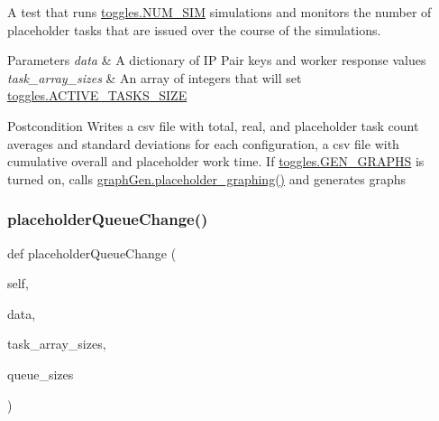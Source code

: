A test that runs \mbox{\hyperlink{namespacedynamicfilterapp_1_1toggles_a3baf5565851cd87736238d8dddfc1106}{toggles.\+N\+U\+M\+\_\+\+S\+IM}} simulations and monitors the number of placeholder tasks that are issued over the course of the simulations. 


\begin{DoxyParams}{Parameters}
{\em data} & A dictionary of IP Pair keys and worker response values \\
\hline
{\em task\+\_\+array\+\_\+sizes} & An array of integers that will set \mbox{\hyperlink{namespacedynamicfilterapp_1_1toggles_a374727dba0574510b39c1e2871f69e48}{toggles.\+A\+C\+T\+I\+V\+E\+\_\+\+T\+A\+S\+K\+S\+\_\+\+S\+I\+ZE}} \\
\hline
\end{DoxyParams}
\begin{DoxyPostcond}{Postcondition}
Writes a csv file with total, real, and placeholder task count averages and standard deviations for each configuration, a csv file with cumulative overall and placeholder work time. If \mbox{\hyperlink{namespacedynamicfilterapp_1_1toggles_a57c1e3f291181d680f3ee118fa5c4ab8}{toggles.\+G\+E\+N\+\_\+\+G\+R\+A\+P\+HS}} is turned on, calls \mbox{\hyperlink{namespacedynamicfilterapp_1_1graph_gen_aa390916522804b2486fb15d5af94c93a}{graph\+Gen.\+placeholder\+\_\+graphing()}} and generates graphs 
\end{DoxyPostcond}
\mbox{\label{classdynamicfilterapp_1_1test__simulations_1_1_simulation_test_a49b243b561aef89859a0f2676124dbc3}} 
\subsubsection{\texorpdfstring{placeholder\+Queue\+Change()}{placeholderQueueChange()}}
{\footnotesize\ttfamily def placeholder\+Queue\+Change (\begin{DoxyParamCaption}\item[{}]{self,  }\item[{}]{data,  }\item[{}]{task\+\_\+array\+\_\+sizes,  }\item[{}]{queue\+\_\+sizes }\end{DoxyParamCaption})}


